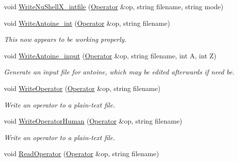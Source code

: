 \begin{DoxyCompactItemize}
\item 
void \hyperlink{classReadWrite_aba64e4422362222ce77f684032a99db0}{Write\+Nu\+Shell\+X\+\_\+intfile} (\hyperlink{classOperator}{Operator} \&op, string filename, string mode)
\item 
void \hyperlink{classReadWrite_a371194595d9412cbb8f1b432a6526f5a}{Write\+Antoine\+\_\+int} (\hyperlink{classOperator}{Operator} \&op, string filename)\hypertarget{classReadWrite_a371194595d9412cbb8f1b432a6526f5a}{}\label{classReadWrite_a371194595d9412cbb8f1b432a6526f5a}

\begin{DoxyCompactList}\small\item\em This now appears to be working properly. \end{DoxyCompactList}\item 
void \hyperlink{classReadWrite_a44ca3ecdadcdccb047d34ab71be5b262}{Write\+Antoine\+\_\+input} (\hyperlink{classOperator}{Operator} \&op, string filename, int A, int Z)\hypertarget{classReadWrite_a44ca3ecdadcdccb047d34ab71be5b262}{}\label{classReadWrite_a44ca3ecdadcdccb047d34ab71be5b262}

\begin{DoxyCompactList}\small\item\em Generate an input file for antoine, which may be edited afterwards if need be. \end{DoxyCompactList}\item 
void \hyperlink{classReadWrite_a771ed1ac7ca0cc9cb6a209da170dd351}{Write\+Operator} (\hyperlink{classOperator}{Operator} \&op, string filename)\hypertarget{classReadWrite_a771ed1ac7ca0cc9cb6a209da170dd351}{}\label{classReadWrite_a771ed1ac7ca0cc9cb6a209da170dd351}

\begin{DoxyCompactList}\small\item\em Write an operator to a plain-\/text file. \end{DoxyCompactList}\item 
void \hyperlink{classReadWrite_af9e6ed6e522518f28ebb5d869f571485}{Write\+Operator\+Human} (\hyperlink{classOperator}{Operator} \&op, string filename)\hypertarget{classReadWrite_af9e6ed6e522518f28ebb5d869f571485}{}\label{classReadWrite_af9e6ed6e522518f28ebb5d869f571485}

\begin{DoxyCompactList}\small\item\em Write an operator to a plain-\/text file. \end{DoxyCompactList}\item 
void \hyperlink{classReadWrite_ab924c67864c7af28bcc22a9b87abafb3}{Read\+Operator} (\hyperlink{classOperator}{Operator} \&op, string filename)\hypertarget{classReadWrite_ab924c67864c7af28bcc22a9b87abafb3}{}\label{classReadWrite_ab924c67864c7af28bcc22a9b87abafb3}


\end{DoxyCompactItemize}
